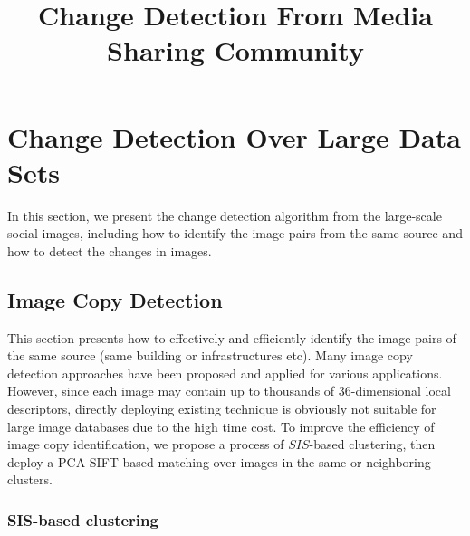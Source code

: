 \documentclass[runningheads,a4paper]{llncs}
\begin{document}
\mainmatter  %

\title{Change Detection From Media Sharing Community }

%
%
\maketitle
\setcounter{section}{4}
\section{Change Detection Over Large Data Sets}\label{sec-algorithm}
In this section, we present the change detection algorithm from the large-scale social images, 
including how to identify the image pairs from the same source and how to detect the changes in images.
\subsection{Image Copy Detection}
This section presents how to effectively and efficiently identify the image pairs of the same source (same building or infrastructures etc). 
Many image copy detection approaches have been proposed and applied for various applications. 
However,  since each image may contain up to thousands of 36-dimensional local descriptors, 
directly deploying existing technique is obviously not suitable for large image databases due to the high time cost. 
To improve the efficiency of image copy identification, 
we propose a process of $SIS$-based clustering,
then deploy a PCA-SIFT-based matching over images in the same or neighboring clusters.

\subsubsection{SIS-based clustering}
\end{document}

